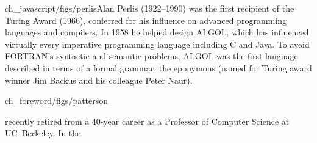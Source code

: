 \begin{sidebargraphic}{ch_javascript/figs/perlis}{Alan Perlis}
  (1922--1990) was the first recipient of the Turing Award (1966), conferred
  for his influence on advanced programming languages and compilers.
  In 1958 he helped design ALGOL,
  which has influenced virtually every imperative programming language
  including C and Java.  To avoid FORTRAN's
  syntactic and semantic problems, ALGOL was the first language
  described in terms of a formal grammar, the eponymous
   (named for Turing award
  winner Jim Backus and his colleague Peter Naur).
\end{sidebargraphic}

\begin{sidebargraphic}{ch_foreword/figs/patterson}{}\end{sidebargraphic}
\noindent
{} recently retired from a 40-year career as a
Professor of Computer Science at
UC~Berkeley. In the
